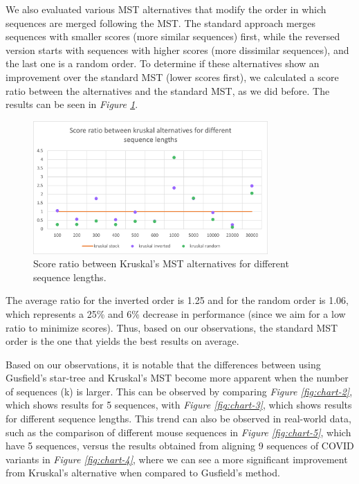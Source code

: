 \documentclass[twoside,openright,titlepage,numbers=noenddot,headinclude,%
                footinclude=true,cleardoublepage=empty,abstractoff, %
                BCOR=5mm,paper=a4,fontsize=11pt,%
                ngerman,american,%
                ]{scrreprt}
\begin{document}
We also evaluated various MST alternatives that modify the order in which sequences are merged following the MST. The standard approach merges sequences with smaller scores (more similar sequences) first, while the reversed version starts with sequences with higher scores (more dissimilar sequences), and the last one is a random order. To determine if these alternatives show an improvement over the standard MST (lower scores first), we calculated a score ratio between the alternatives and the standard MST, as we did before. The results can be seen in \textit{Figure \ref{fig:kruskalVSkruskal}}. 

\begin{figure}[H]
\includegraphics[width=0.8\textwidth]{report/kruskalsVSkruskal.png}
\centering
\caption{Score ratio between Kruskal's MST alternatives for different sequence lengths.}
\label{fig:kruskalVSkruskal}
\end{figure}

The average ratio for the inverted order is 1.25 and for the random order is 1.06, which represents a 25\% and 6\% decrease in performance (since we aim for a low ratio to minimize scores). Thus, based on our observations, the standard MST order is the one that yields the best results on average.

Based on our observations, it is notable that the differences between using Gusfield's star-tree and Kruskal's MST become more apparent when the number of sequences (k) is larger. This can be observed by comparing \textit{Figure \ref{fig:chart-2}}, which shows results for 5 sequences, with \textit{Figure \ref{fig:chart-3}}, which shows results for different sequence lengths. This trend can also be observed in real-world data, such as the comparison of different mouse sequences in \textit{Figure \ref{fig:chart-5}}, which have 5 sequences, versus the results obtained from aligning 9 sequences of COVID variants in \textit{Figure \ref{fig:chart-4}}, where we can see a more significant improvement from Kruskal's alternative when compared to Gusfield's method.
\end{document}
